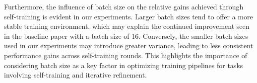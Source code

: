 Furthermore, the influence of batch size on the relative gains achieved through self-training is evident in our experiments. Larger batch sizes tend to offer a more stable training environment, which may explain the continued improvement seen in the baseline paper with a batch size of 16. Conversely, the smaller batch sizes used in our experiments may introduce greater variance, leading to less consistent performance gains across self-training rounds. This highlights the importance of considering batch size as a key factor in optimizing training pipelines for tasks involving self-training and iterative refinement.